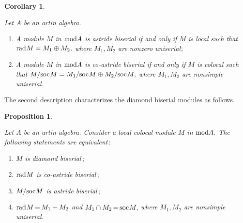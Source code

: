 \documentclass[10pt]{amsart}
\newtheorem{Prop}[Theo]{Proposition}
\newtheorem{Cor}[Theo]{Corollary}
\theoremstyle{definition}
\newcommand{\mmod}{{\rm mod}}
\newcommand{\rad}{{\rm rad}\hspace{.5pt}}
\newcommand{\soc}{{\rm soc}\hspace{.5pt}}
\newcommand{\hp}{\hspace{.5pt}}
\begin{document}
\begin{Cor}\label{astride_bsm}

Let $A$ be an artin algebra. 

\begin{enumerate}[$(1)$]

\vspace{-2.5pt}
    
\item A module $M$ in $\mmod A$ is astride biserial if and only if $M$ is local such that $\rad M=M_1\oplus M_2,$ where $M_1, M_2$ are nonzero uniserial$\hp ;$ 

\item A module $M$ in $\mmod A$ is co-astride biserial if and only if $M$ is colocal such that
$M/\soc M=M_1/\soc M \oplus M_2/\soc M,$ where $M_1, M_2$ are nonsimple uniserial.

\end{enumerate} \end{Cor}


\vspace{2pt}

The second description characterizes the diamond biserial modules as follows. 
\vspace{-1pt}

\begin{Prop}\label{biloc_bis} 

Let $A$ be an artin algebra. Consider a local colocal module $M$ in $\mmod A.$ The following statements are equivalent$\,:$

\begin{enumerate}[$(1)$]

\vspace{-2.5pt}
    
\item $M$ is diamond biserial$\,;$

\item $\rad M$ is co-astride biserial$\,;$

\item $M/\soc M$ is astride biserial$\,;$

\vspace{-.5pt}

\item $\rad M\hspace{-1pt} = \hspace{-1pt}  M_1+M_2$ and $M_1\cap M_2\hspace{-1pt} = \hspace{-1pt}  \soc M,$ where $M_1, M_2$ are nonsimple uniserial. %

\end{enumerate}\end{Prop}
\end{document}
